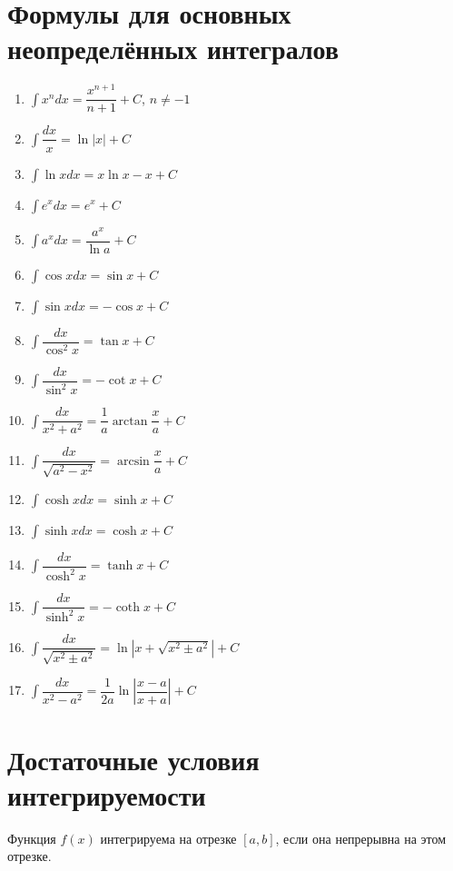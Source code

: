 \documentclass[12pt]{article}
\begin{document}
\section{Формулы для основных неопределённых интегралов}
\setlength{\columnsep}{1cm}
\begin{multicols}{2}
    \begin{enumerate}
        \item $\displaystyle \int x^ndx = \dfrac{x^{n + 1}}{n + 1} + C$, $n \neq -1$
        \item $\displaystyle \int \dfrac{dx}{x} = \ln{|x|} + C$
        \item $\displaystyle \int \ln{x}dx = x\ln{x} - x + C$
        \item $\displaystyle \int e^xdx = e^x + C$
        \item $\displaystyle \int a^xdx = \dfrac{a^x}{\ln{a}} + C$
        \item $\displaystyle \int \cos{x}dx = \sin{x} + C$
        \item $\displaystyle \int \sin{x}dx = - \cos{x} + C$
        \item $\displaystyle \int \dfrac{dx}{\cos^2{x}} = \tan{x} + C$
        \item $\displaystyle \int \dfrac{dx}{\sin^2{x}} = -\cot{x} + C$
        \item $\displaystyle \int \dfrac{dx}{x^2 + a^2} = \dfrac{1}{a}\arctan{\dfrac{x}{a}} + C$
        \item $\displaystyle \int \dfrac{dx}{\sqrt{a^2 - x^2}} = \arcsin{\dfrac{x}{a}} + C$
        \item $\displaystyle \int \cosh{x}dx = \sinh{x} + C$
        \item $\displaystyle \int \sinh{x}dx = \cosh{x} + C$
        \item $\displaystyle \int \dfrac{dx}{\cosh^2{x}} = \tanh{x} + C$
        \item $\displaystyle \int \dfrac{dx}{\sinh^2{x}} = -\coth{x} + C$
        \item $\displaystyle \int \dfrac{dx}{\sqrt{x^2 \pm a^2}} = \ln{|x + \sqrt{x^2 \pm a^2}|} + C$
        \item $\displaystyle \int \dfrac{dx}{x^2 - a^2} = \dfrac{1}{2a}\ln{\left|\dfrac{x - a}{x + a}\right|} + C$
    \end{enumerate}
\end{multicols}

\section{Достаточные условия интегрируемости}
Функция $f(x)$ интегрируема на отрезке $[a,b]$, если она непрерывна на этом отрезке.
\end{document}
